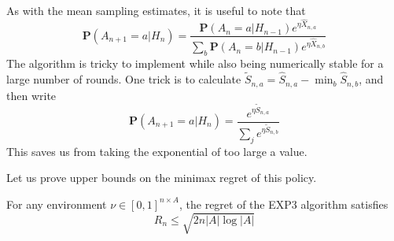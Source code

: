 As with the mean sampling estimates, it is useful to note that
%
\[ \mathbf{P}(A_{n+1} = a | H_n) = \frac{\mathbf{P}(A_n = a | H_{n-1}) e^{\eta \widehat{X}_{n,a}}}{\sum_b \mathbf{P}(A_n = b | H_{n-1}) e^{\eta \widehat{X}_{n,b}}} \]
%
The algorithm is tricky to implement while also being numerically stable for a large number of rounds. One trick is to calculate $\tilde{S}_{n,a} = \widehat{S}_{n,a} - \min_b \widehat{S}_{n,b}$, and then write
%
\[ \mathbf{P}(A_{n+1} = a | H_n) = \frac{e^{\eta \tilde{S}_{n,a}}}{\sum_j e^{\eta \tilde{S}_{n,b}}} \]
%
This saves us from taking the exponential of too large a value.

Let us prove upper bounds on the minimax regret of this policy.

\begin{theorem}
    For any environment $\nu \in [0,1]^{n \times A}$, the regret of the EXP3 algorithm satisfies
    \[ R_n \leq \sqrt{2 n |A| \log |A|} \]
\end{theorem}
